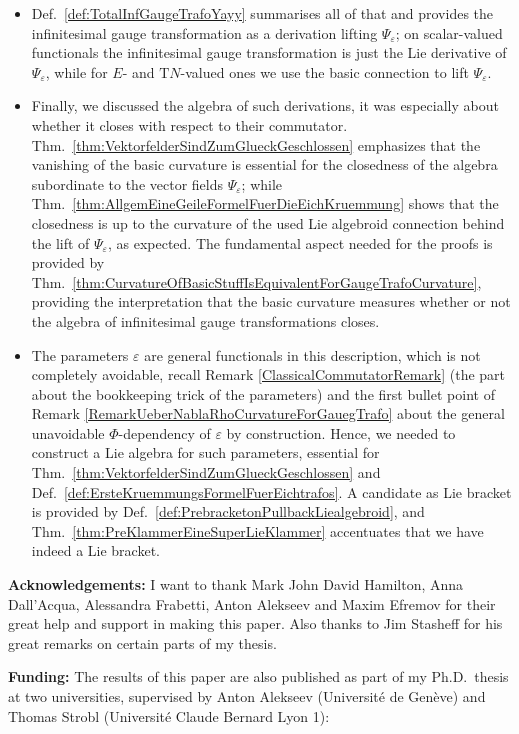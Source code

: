 \documentclass[a4paper,oneside,11pt]{scrartcl} %
\theoremstyle{plain}
\theoremstyle{remark}
\theoremstyle{definition}
\begin{document}
\begin{itemize}
	\item Def.~\ref{def:TotalInfGaugeTrafoYayy} summarises all of that and provides the infinitesimal gauge transformation as a derivation lifting $\Psi_\varepsilon$; on scalar-valued functionals the infinitesimal gauge transformation is just the Lie derivative of $\Psi_\varepsilon$, while for $E$- and $\mathrm{T}N$-valued ones we use the basic connection to lift $\Psi_\varepsilon$.
	\item Finally, we discussed the algebra of such derivations, it was especially about whether it closes with respect to their commutator. Thm.~\ref{thm:VektorfelderSindZumGlueckGeschlossen} emphasizes that the vanishing of the basic curvature is essential for the closedness of the algebra subordinate to the vector fields $\Psi_\varepsilon$; while Thm.~\ref{thm:AllgemEineGeileFormelFuerDieEichKruemmung} shows that the closedness is up to the curvature of the used Lie algebroid connection behind the lift of $\Psi_\varepsilon$, as expected. The fundamental aspect needed for the proofs is provided by Thm.~\ref{thm:CurvatureOfBasicStuffIsEquivalentForGaugeTrafoCurvature}, providing the interpretation that the basic curvature measures whether or not the algebra of infinitesimal gauge transformations closes. 
	\item The parameters $\varepsilon$ are general functionals in this description, which is not completely avoidable, recall Remark \ref{ClassicalCommutatorRemark} (the part about the bookkeeping trick of the parameters) and the first bullet point of Remark \ref{RemarkUeberNablaRhoCurvatureForGauegTrafo} about the general unavoidable $\Phi$-dependency of $\varepsilon$ by construction. Hence, we needed to construct a Lie algebra for such parameters, essential for Thm.~\ref{thm:VektorfelderSindZumGlueckGeschlossen} and Def.~\ref{def:ErsteKruemmungsFormelFuerEichtrafos}. A candidate as Lie bracket is provided by Def.~\ref{def:PrebracketonPullbackLiealgebroid}, and Thm.~\ref{thm:PreKlammerEineSuperLieKlammer} accentuates that we have indeed a Lie bracket.
\end{itemize}

\textbf{Acknowledgements:} I want to thank Mark John David Hamilton, Anna Dall'Acqua, Alessandra Frabetti, Anton Alekseev and Maxim Efremov for their great help and support in making this paper. Also thanks to Jim Stasheff for his great remarks on certain parts of my thesis.

\textbf{Funding:} The results of this paper are also published as part of my Ph.D.~thesis at two universities, supervised by Anton Alekseev (Universit\'{e} de Gen\`eve) and Thomas Strobl (Universit\'{e} Claude Bernard Lyon 1):
\end{document}
